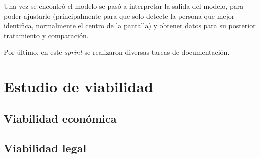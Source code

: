 Una vez se encontró el modelo se pasó a interpretar la salida del modelo, para poder ajustarlo (principalmente para que solo detecte la persona que mejor identifica, normalmente el centro de la pantalla) y obtener datos para su posterior tratamiento y comparación.

Por último, en este \textit{sprint} se realizaron diversas tareas de documentación.

\section{Estudio de viabilidad}

\subsection{Viabilidad económica}

\subsection{Viabilidad legal}


